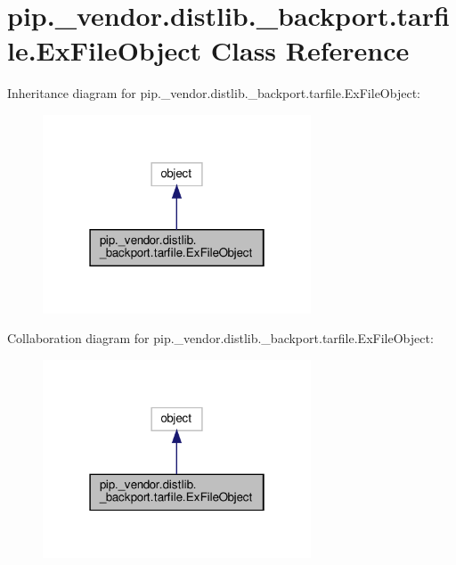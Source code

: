\hypertarget{classpip_1_1__vendor_1_1distlib_1_1__backport_1_1tarfile_1_1ExFileObject}{}\section{pip.\+\_\+vendor.\+distlib.\+\_\+backport.\+tarfile.\+Ex\+File\+Object Class Reference}
\label{classpip_1_1__vendor_1_1distlib_1_1__backport_1_1tarfile_1_1ExFileObject}


Inheritance diagram for pip.\+\_\+vendor.\+distlib.\+\_\+backport.\+tarfile.\+Ex\+File\+Object\+:
\nopagebreak
\begin{figure}[H]
\begin{center}
\leavevmode
\includegraphics[width=226pt]{classpip_1_1__vendor_1_1distlib_1_1__backport_1_1tarfile_1_1ExFileObject__inherit__graph}
\end{center}
\end{figure}


Collaboration diagram for pip.\+\_\+vendor.\+distlib.\+\_\+backport.\+tarfile.\+Ex\+File\+Object\+:
\nopagebreak
\begin{figure}[H]
\begin{center}
\leavevmode
\includegraphics[width=226pt]{classpip_1_1__vendor_1_1distlib_1_1__backport_1_1tarfile_1_1ExFileObject__coll__graph}
\end{center}
\end{figure}
